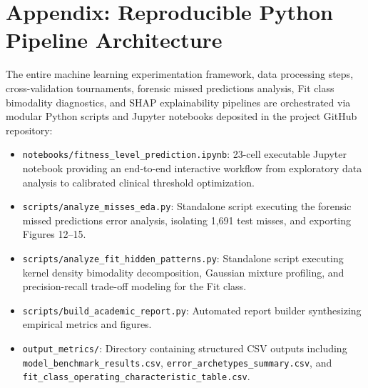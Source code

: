 \documentclass[11pt,a4paper]{article}
\begin{document}
\section*{Appendix: Reproducible Python Pipeline Architecture}

The entire machine learning experimentation framework, data processing steps, cross-validation tournaments, forensic missed predictions analysis, Fit class bimodality diagnostics, and SHAP explainability pipelines are orchestrated via modular Python scripts and Jupyter notebooks deposited in the project GitHub repository:

\begin{itemize}[leftmargin=*,itemsep=1pt]
    \item \texttt{notebooks/fitness\_level\_prediction.ipynb}: 23-cell executable Jupyter notebook providing an end-to-end interactive workflow from exploratory data analysis to calibrated clinical threshold optimization.
    \item \texttt{scripts/analyze\_misses\_eda.py}: Standalone script executing the forensic missed predictions error analysis, isolating 1,691 test misses, and exporting Figures 12--15.
    \item \texttt{scripts/analyze\_fit\_hidden\_patterns.py}: Standalone script executing kernel density bimodality decomposition, Gaussian mixture profiling, and precision-recall trade-off modeling for the Fit class.
    \item \texttt{scripts/build\_academic\_report.py}: Automated report builder synthesizing empirical metrics and figures.
    \item \texttt{output\_metrics/}: Directory containing structured CSV outputs including \texttt{model\_benchmark\_results.csv}, \texttt{error\_archetypes\_summary.csv}, and \texttt{fit\_class\_operating\_characteristic\_table.csv}.
\end{itemize}
\end{document}
